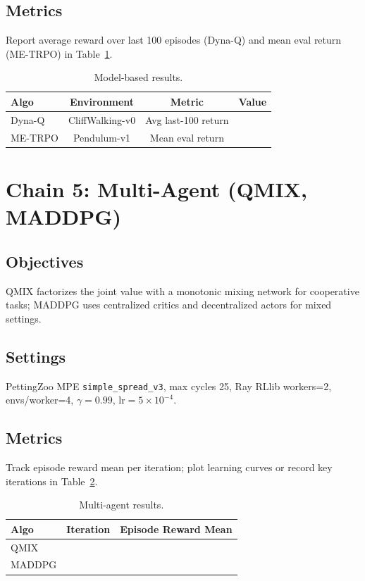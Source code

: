 \documentclass[11pt]{article}
\newcommand{\code}[1]{\texttt{#1}}
\begin{document}
\subsection{Metrics}
Report average reward over last 100 episodes (Dyna-Q) and mean eval return (ME-TRPO) in Table~\ref{tab:modelresults}.

\begin{table}[h]
\centering
\caption{Model-based results.}
\label{tab:modelresults}
\begin{tabular}{lccc}
\toprule
Algo & Environment & Metric & Value \\
\midrule
Dyna-Q & CliffWalking-v0 & Avg last-100 return & \\
ME-TRPO & Pendulum-v1 & Mean eval return & \\
\bottomrule
\end{tabular}
\end{table}

\section{Chain 5: Multi-Agent (QMIX, MADDPG)}
\subsection{Objectives}
QMIX factorizes the joint value with a monotonic mixing network for cooperative tasks; MADDPG uses centralized critics and decentralized actors for mixed settings.

\subsection{Settings}
PettingZoo MPE \code{simple\_spread\_v3}, max cycles 25, Ray RLlib workers=2, envs/worker=4, $\gamma=0.99$, $\text{lr}=5\times10^{-4}$.

\subsection{Metrics}
Track episode reward mean per iteration; plot learning curves or record key iterations in Table~\ref{tab:marlresults}.

\begin{table}[h]
\centering
\caption{Multi-agent results.}
\label{tab:marlresults}
\begin{tabular}{lcc}
\toprule
Algo & Iteration & Episode Reward Mean \\
\midrule
QMIX & & \\
MADDPG & & \\
\bottomrule
\end{tabular}
\end{table}
\end{document}
